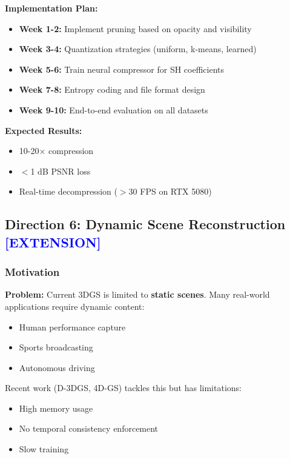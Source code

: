 \documentclass[11pt,letterpaper]{article}
\newcommand{\highlight}[1]{\textcolor{blue}{\textbf{#1}}}
\begin{document}
\textbf{Implementation Plan:}
\begin{itemize}[leftmargin=*]
    \item \textbf{Week 1-2:} Implement pruning based on opacity and visibility
    \item \textbf{Week 3-4:} Quantization strategies (uniform, k-means, learned)
    \item \textbf{Week 5-6:} Train neural compressor for SH coefficients
    \item \textbf{Week 7-8:} Entropy coding and file format design
    \item \textbf{Week 9-10:} End-to-end evaluation on all datasets
\end{itemize}

\textbf{Expected Results:}
\begin{itemize}[leftmargin=*]
    \item 10-20$\times$ compression
    \item $<$1 dB PSNR loss
    \item Real-time decompression ($>$30 FPS on RTX 5080)
\end{itemize}

\subsection{Direction 6: Dynamic Scene Reconstruction \highlight{[EXTENSION]}}

\subsubsection{Motivation}

\textbf{Problem:} Current 3DGS is limited to \textbf{static scenes}. Many real-world applications require dynamic content:
\begin{itemize}[leftmargin=*]
    \item Human performance capture
    \item Sports broadcasting
    \item Autonomous driving
\end{itemize}

Recent work (D-3DGS, 4D-GS) tackles this but has limitations:
\begin{itemize}[leftmargin=*]
    \item High memory usage
    \item No temporal consistency enforcement
    \item Slow training
\end{itemize}
\end{document}
